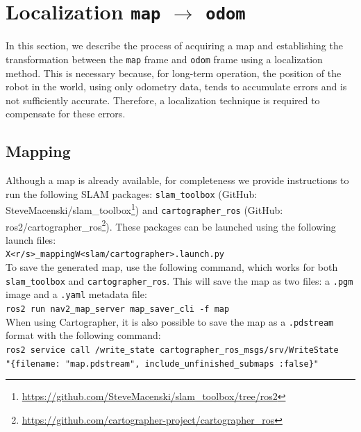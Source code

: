 \section{Localization \texttt{map} $\rightarrow$ \texttt{odom}}
In this section, we describe the process of acquiring a map and establishing the transformation between the \texttt{map} frame and \texttt{odom} frame using a localization method. This is necessary because, for long-term operation, the position of the robot in the world, using only odometry data, tends to accumulate errors and is not sufficiently accurate. Therefore, a localization technique is required to compensate for these errors\cite{sh-p1-prelude}.
\subsection{Mapping}
Although a map is already available, for completeness we provide instructions to run the following SLAM packages: \texttt{slam\_toolbox}\cite{Macenski2021} (GitHub: SteveMacenski/slam\_toolbox\footnote{\href{https://github.com/SteveMacenski/slam_toolbox/tree/ros2}{https://github.com/SteveMacenski/slam\_toolbox/tree/ros2}}) and \texttt{cartographer\_ros}\cite{45466} (GitHub: ros2/cartographer\_ros\footnote{\href{https://github.com/cartographer-project/cartographer_ros}{https://github.com/cartographer-project/cartographer\_ros}}). These packages can be launched using the following launch files:\\
\hspace*{10mm} \texttt{X<r/s>\_mappingW<slam/cartographer>.launch.py} \\
To save the generated map, use the following command, which works for both  \texttt{slam\_toolbox} and \texttt{cartographer\_ros}. This will save the map as two files:  a \texttt{.pgm} image and a \texttt{.yaml} metadata file:\\
\hspace*{10mm} \texttt{ros2 run nav2\_map\_server map\_saver\_cli -f map}\\
When using Cartographer, it is also possible to save the map as a \texttt{.pdstream} format with the following command:\\
    \hspace*{10mm} \texttt{ros2 service call /write\_state cartographer\_ros\_msgs/srv/WriteState\\ 
    \hspace*{15mm}"\{filename: "map.pdstream", include\_unfinished\_submaps :false\}"}
\newpage
